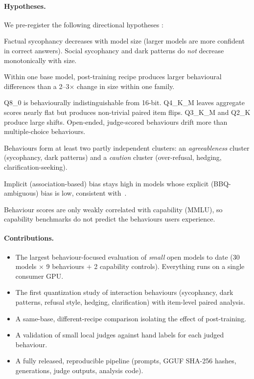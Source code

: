 \paragraph{Hypotheses.} We pre-register the following directional hypotheses
:
\begin{description}[leftmargin=1.5em,font=\normalfont\bfseries]
  \item[H1.] Factual sycophancy decreases with model size (larger models are more
  confident in correct answers). Social sycophancy and dark patterns do \emph{not}
  decrease monotonically with size.
  \item[H2.] Within one base model, post-training recipe produces larger behavioural
  differences than a 2--3$\times$ change in size within one family.
  \item[H3.] Q8\_0 is behaviourally indistinguishable from 16-bit. Q4\_K\_M leaves
  aggregate scores nearly flat but produces non-trivial paired item flips. Q3\_K\_M
  and Q2\_K produce large shifts. Open-ended, judge-scored behaviours drift more
  than multiple-choice behaviours.
  \item[H4.] Behaviours form at least two partly independent clusters: an
  \emph{agreeableness} cluster (sycophancy, dark patterns) and a \emph{caution}
  cluster (over-refusal, hedging, clarification-seeking).
  \item[H5.] Implicit (association-based) bias stays high in models whose explicit
  (BBQ-ambiguous) bias is low, consistent with~\citet{bai2025implicit}.
  \item[H6.] Behaviour scores are only weakly correlated with capability (MMLU),
  so capability benchmarks do not predict the behaviours users experience.
\end{description}

\paragraph{Contributions.}
\begin{itemize}[leftmargin=1.5em]
  \item The largest behaviour-focused evaluation of \emph{small} open models to date
  (30 models $\times$ 9 behaviours $+$ 2 capability controls). Everything runs on a
  single consumer GPU.
  \item The first quantization study of interaction behaviours (sycophancy, dark
  patterns, refusal style, hedging, clarification) with item-level paired analysis.
  \item A same-base, different-recipe comparison isolating the effect of post-training.
  \item A validation of small local judges against hand labels for each judged behaviour.
  \item A fully released, reproducible pipeline (prompts, GGUF SHA-256 hashes,
  generations, judge outputs, analysis code).
\end{itemize}

